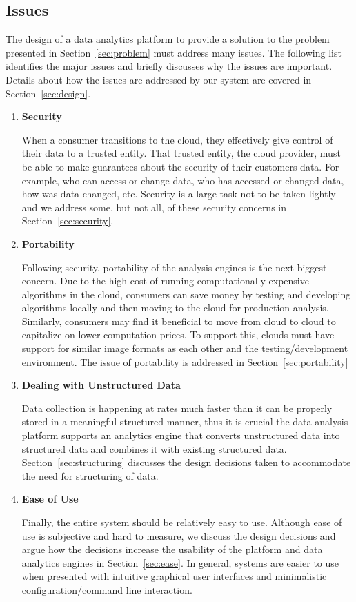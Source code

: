 \subsection{Issues}
\label{sec:issues}
The design of a data analytics platform to provide a solution to the
problem presented in Section~\ref{sec:problem} must address many issues.
The following list identifies the major issues and briefly discusses
why the issues are important. Details about how the issues are 
addressed by our system are covered in Section~\ref{sec:design}.  

\begin{enumerate}
  \item \textbf{Security}

    When a consumer transitions to the cloud, they effectively give
control of their data to a trusted entity. That trusted entity, the
cloud provider, must be able to make guarantees about the security of their
customers data. For example, who can access or change data, who
has accessed or changed data, how was data changed, etc. Security is a
large task not to be taken lightly and we address some, but not all, of
these security concerns in Section~\ref{sec:security}.

  \item \textbf{Portability}

    Following security, portability of the analysis engines is the
next biggest concern. Due to the high cost of running computationally
expensive algorithms in the cloud, consumers can save money by testing
and developing algorithms locally and then moving to the cloud for
production analysis. Similarly, consumers may find it beneficial
to move from cloud to cloud to capitalize on lower computation prices.
To support this, clouds must have support for similar image formats as
each other and the testing/development environment. The issue of
portability is addressed in Section~\ref{sec:portability}

  \item \textbf{Dealing with Unstructured Data}

    Data collection is happening at rates much faster than it can be
properly stored in a meaningful structured manner, thus it is crucial
the data analysis platform supports an analytics engine that converts
unstructured data into structured data and combines it with existing
structured data. Section~\ref{sec:structuring} discusses the design
decisions taken to accommodate the need for structuring of data.

  \item \textbf{Ease of Use}

    Finally, the entire system should be relatively easy to use.
Although ease of use is subjective and hard to measure, we discuss the
design decisions and argue how the decisions increase the usability of the
platform and data analytics engines in Section~\ref{sec:ease}. In
general, systems are easier to use when presented with intuitive
graphical user interfaces and minimalistic configuration/command line
interaction.

\end{enumerate} 
